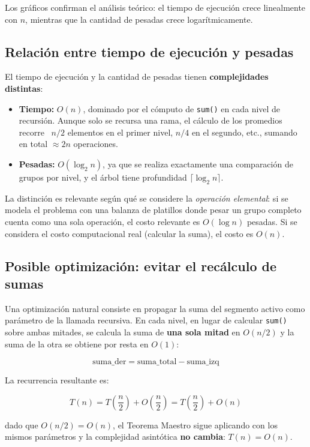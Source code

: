 Los gráficos confirman el análisis teórico: el tiempo de ejecución crece linealmente con $n$, mientras que la cantidad
de pesadas crece logarítmicamente.

\subsection{Relación entre tiempo de ejecución y pesadas}

El tiempo de ejecución y la cantidad de pesadas tienen \textbf{complejidades distintas}:

\begin{itemize}
	\item \textbf{Tiempo:} $O(n)$, dominado por el cómputo de \texttt{sum()} en cada nivel de recursión. Aunque solo se
	      recursa una rama, el cálculo de los promedios recorre ~$n/2$ elementos en el primer nivel, $n/4$ en el
	      segundo, etc., sumando en total $\approx 2n$ operaciones.
	\item \textbf{Pesadas:} $O(\log_2 n)$, ya que se realiza exactamente una comparación de grupos por nivel, y el
	      árbol tiene profundidad $\lceil \log_2 n \rceil$.
\end{itemize}

La distinción es relevante según qué se considere la \textit{operación elemental}: si se modela el problema con una
balanza de platillos donde pesar un grupo completo cuenta como una sola operación, el costo relevante es $O(\log n)$
pesadas. Si se considera el costo computacional real (calcular la suma), el costo es $O(n)$.

\subsection{Posible optimización: evitar el recálculo de sumas}

Una optimización natural consiste en propagar la suma del segmento activo como parámetro de la llamada recursiva.
En cada nivel, en lugar de calcular \texttt{sum()} sobre ambas mitades, se calcula la suma de \textbf{una sola mitad}
en $O(n/2)$ y la suma de la otra se obtiene por resta en $O(1)$:

\[
\text{suma\_der} = \text{suma\_total} - \text{suma\_izq}
\]

La recurrencia resultante es:

\[
T(n) = T\!\left(\frac{n}{2}\right) + O\!\left(\frac{n}{2}\right) = T\!\left(\frac{n}{2}\right) + O(n)
\]

dado que $O(n/2) = O(n)$, el Teorema Maestro sigue aplicando con los mismos parámetros y la complejidad asintótica
\textbf{no cambia}: $T(n) = O(n)$.

